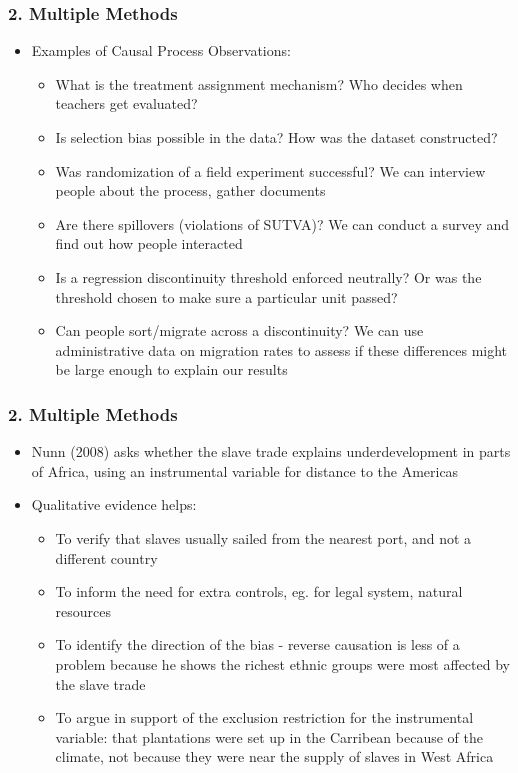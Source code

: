 \documentclass[xcolor=x11names,compress]{beamer}\usepackage[]{graphicx}\usepackage[]{xcolor}
\renewcommand{\(}{\begin{columns}}
\renewcommand{\)}{\end{columns}}
\newcommand{\<}[1]{\begin{column}{#1}}
\renewcommand{\>}{\end{column}}
\begin{document}
\begin{frame}
\frametitle{2. Multiple Methods}
\begin{itemize}
\item Examples of Causal Process Observations:
\pause
\begin{itemize}
\item What is the treatment assignment mechanism? Who decides when teachers get evaluated?
\pause
\item Is selection bias possible in the data? How was the dataset constructed?
\pause
\item Was randomization of a field experiment successful? We can interview people about the process, gather documents
\pause
\item Are there spillovers (violations of SUTVA)? We can conduct a survey and find out how people interacted
\pause
\item Is a regression discontinuity threshold enforced neutrally? Or was the threshold chosen to make sure a particular unit passed?
\pause
\item Can people sort/migrate across a discontinuity? We can use administrative data on migration rates to assess if these differences might be large enough to explain our results
\end{itemize}
\end{itemize}
\end{frame}

\begin{frame}
\frametitle{2. Multiple Methods}
\begin{itemize}
\item Nunn (2008) asks whether the slave trade explains underdevelopment in parts of Africa, using an instrumental variable for distance to the Americas
\pause
\item Qualitative evidence helps:
\pause
\begin{itemize}
\item To verify that slaves usually sailed from the nearest port, and not a different country
\pause
\item To inform the need for extra controls, eg. for legal system, natural resources
\pause
\item To identify the direction of the bias - reverse causation is less of a problem because he shows the richest ethnic groups were most affected by the slave trade
\pause
\item To argue in support of the exclusion restriction for the instrumental variable: that plantations were set up in the Carribean because of the climate, not because they were near the supply of slaves in West Africa
\end{itemize}
\end{itemize}
\end{frame}
\end{document}
